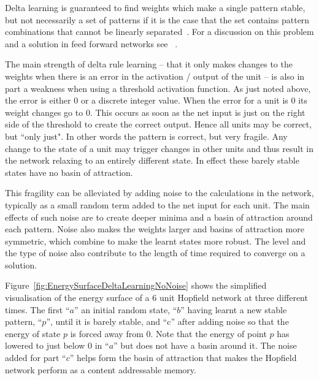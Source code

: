 
Delta learning is guaranteed to find weights which make a single pattern stable, but not necessarily a set of patterns if it is the case that the set contains pattern combinations that cannot be linearly separated~\citep{Novikoff1962}. For a discussion on this problem and a solution in feed forward networks see ~\citep{Rumelhart86}.

The main strength of delta rule learning -- that it only makes changes to the weights when there is an error in the activation / output of the unit -- is also in part a weakness when using a threshold activation function.  As just noted above, the error is either $0$ or a discrete integer value.  When the error for a unit is $0$ its weight changes go to $0$.  This occurs as soon as the net input is just on the right side of the threshold to create the correct output.  Hence all units may be correct, but ``only just". In other words the pattern is correct, but very fragile. Any change to the state of a unit may trigger changes in other units and thus result in the network relaxing to an entirely different state.  In effect these barely stable states have no basin of attraction.

This fragility can be alleviated by adding noise to the calculations in the network, typically as a small random term added to the net input for each unit.  The main effects of such noise are to create deeper minima and a basin of attraction around each pattern.  Noise also makes the weights larger and basins of attraction more symmetric, which combine to make the learnt states more robust. The level and the type of noise also contribute to the length of time required to converge on a solution.

Figure~\ref{fig:EnergySurfaceDeltaLearningNoNoise}  shows the simplified visualisation of the energy surface of a 6 unit Hopfield network  at three different times.  The first ``$a$'' an initial random state, ``$b$'' having learnt a new stable pattern, ``$p$'', until it is barely stable, and ``c'' after adding noise so that the energy of state $p$ is forced away from 0. Note that the energy of point $p$ has lowered to just below 0 in ``$a$'' but does not have a basin around it.  The noise added for part ``$c$'' helps form the basin of attraction that makes the Hopfield network perform as a content addressable memory. 



